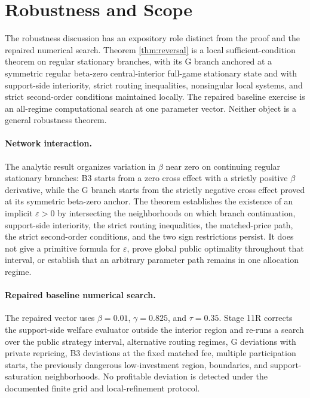 \section{Robustness and Scope}\label{sec:robustness}

The robustness discussion has an expository role distinct from the proof and the repaired numerical search. Theorem \ref{thm:reversal} is a local sufficient-condition theorem on regular stationary branches, with its G branch anchored at a symmetric regular beta-zero central-interior full-game stationary state and with support-side interiority, strict routing inequalities, nonsingular local systems, and strict second-order conditions maintained locally. The repaired baseline exercise is an all-regime computational search at one parameter vector. Neither object is a general robustness theorem.

\paragraph{Network interaction.}
The analytic result organizes variation in $\beta$ near zero on continuing regular stationary branches: B3 starts from a zero cross effect with a strictly positive $\beta$ derivative, while the G branch starts from the strictly negative cross effect proved at its symmetric beta-zero anchor. The theorem establishes the existence of an implicit $\varepsilon>0$ by intersecting the neighborhoods on which branch continuation, support-side interiority, the strict routing inequalities, the matched-price path, the strict second-order conditions, and the two sign restrictions persist. It does not give a primitive formula for $\varepsilon$, prove global public optimality throughout that interval, or establish that an arbitrary parameter path remains in one allocation regime.

\paragraph{Repaired baseline numerical search.}
The repaired vector uses $\beta=0.01$, $\gamma=0.825$, and $\tau=0.35$. Stage 11R corrects the support-side welfare evaluator outside the interior region and re-runs a search over the public strategy interval, alternative routing regimes, G deviations with private repricing, B3 deviations at the fixed matched fee, multiple participation starts, the previously dangerous low-investment region, boundaries, and support-saturation neighborhoods. No profitable deviation is detected under the documented finite grid and local-refinement protocol.

